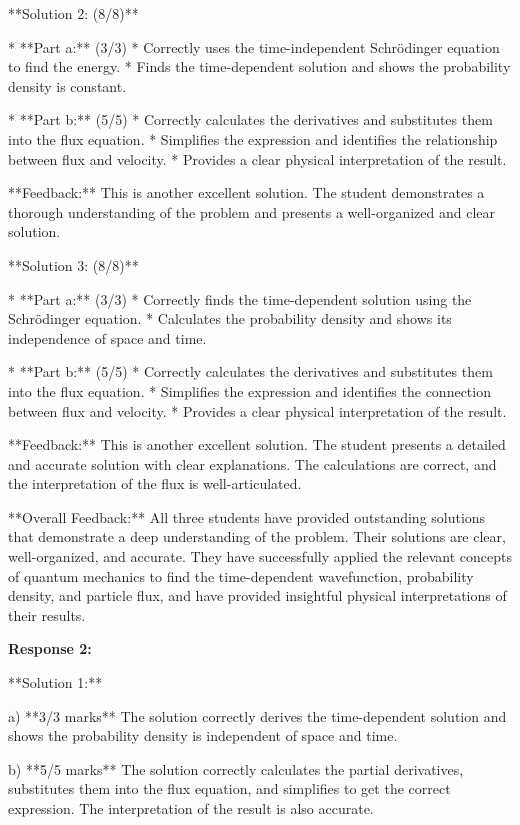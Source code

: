 \documentclass[a4paper,11pt]{article}
\begin{document}
**Solution 2: (8/8)**

*   **Part a:** (3/3) 
    *   Correctly uses the time-independent Schrödinger equation to find the energy.
    *   Finds the time-dependent solution and shows the probability density is constant.

*   **Part b:** (5/5)
    *   Correctly calculates the derivatives and substitutes them into the flux equation.
    *   Simplifies the expression and identifies the relationship between flux and velocity.
    *   Provides a clear physical interpretation of the result.

**Feedback:** This is another excellent solution. The student demonstrates a thorough understanding of the problem and presents a well-organized and clear solution.

**Solution 3: (8/8)**

*   **Part a:** (3/3) 
    *   Correctly finds the time-dependent solution using the Schrödinger equation.
    *   Calculates the probability density and shows its independence of space and time.

*   **Part b:** (5/5)
    *   Correctly calculates the derivatives and substitutes them into the flux equation.
    *   Simplifies the expression and identifies the connection between flux and velocity.
    *   Provides a clear physical interpretation of the result.

**Feedback:** This is another excellent solution. The student presents a detailed and accurate solution with clear explanations. The calculations are correct, and the interpretation of the flux is well-articulated.

**Overall Feedback:** All three students have provided outstanding solutions that demonstrate a deep understanding of the problem. Their solutions are clear, well-organized, and accurate. They have successfully applied the relevant concepts of quantum mechanics to find the time-dependent wavefunction, probability density, and particle flux, and have provided insightful physical interpretations of their results.

\textbf{Response 2:}

**Solution 1:**

a) **3/3 marks**
The solution correctly derives the time-dependent solution and shows the probability density is independent of space and time.

b) **5/5 marks**
The solution correctly calculates the partial derivatives, substitutes them into the flux equation, and simplifies to get the correct expression. The interpretation of the result is also accurate.
\end{document}
